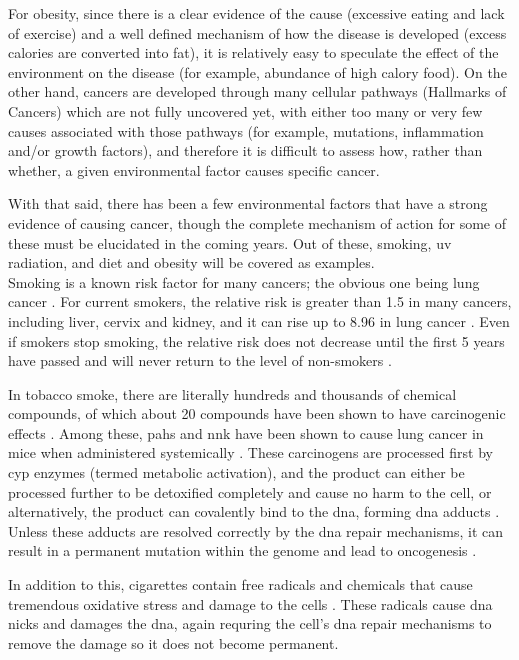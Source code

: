 For obesity, since there is a clear evidence of the cause (excessive eating and lack of exercise) and a well defined mechanism of how the disease is developed (excess calories are converted into fat), it is relatively easy to speculate the effect of the environment on the disease (for example, abundance of high calory food).
On the other hand, cancers are developed through many cellular pathways (Hallmarks of Cancers) which are not fully uncovered yet, with either too many or very few causes associated with those pathways (for example, mutations, inflammation and/or growth factors), and therefore it is difficult to assess how, rather than whether, a given environmental factor causes specific cancer.

With that said, there has been a few environmental factors that have a strong evidence of causing cancer, though the complete mechanism of action for some of these must be elucidated in the coming years.
Out of these, smoking, \gls{uv} radiation, and diet and obesity will be covered as examples.
\\

\noindent
Smoking is a known risk factor for many cancers; the obvious one being lung cancer \citep{Gandini2008,Hecht1999}.
For current smokers, the relative risk is greater than 1.5 in many cancers, including liver, cervix and kidney, and it can rise up to 8.96 in lung cancer \citep{Gandini2008}.
Even if smokers stop smoking, the relative risk does not decrease until the first 5 years have passed and will never return to the level of non-smokers \citep{Hecht1999}.

In tobacco smoke, there are literally hundreds and thousands of chemical compounds, of which about 20 compounds have been shown to have carcinogenic effects \citep{Hecht1999}.
Among these, \glspl{pah} and \gls{nnk} have been shown to cause lung cancer in mice when administered systemically \citep{Hecht1999}.
These carcinogens are processed first by \gls{cyp} enzymes (termed meta\-bolic activation), and the product can either be processed further to be detoxified completely and cause no harm to the cell, or alternatively, the product can covalently bind to the \acrshort{dna}, forming \acrshort{dna} adducts \citep{Hecht1999}.
Unless these adducts are resolved correctly by the \acrshort{dna} repair mechanisms, it can result in a permanent mutation within the genome and lead to oncogenesis \citep{Hecht1999}.

In addition to this, cigarettes contain free radicals and chemicals that cause tremendous oxidative stress and damage to the cells \citep{Hecht1999}.
These radicals cause \acrshort{dna} nicks and damages the \acrshort{dna}, again requring the cell's \acrshort{dna} repair mechanisms to remove the damage so it does not become permanent.
\\

